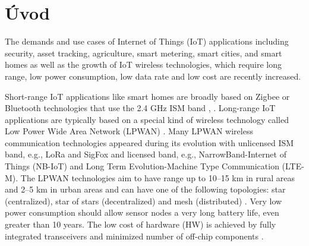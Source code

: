 \chapter{Úvod}
The demands and use cases of Internet of Things (IoT) applications including security, asset tracking, agriculture, smart metering, smart cities, and smart homes as well as the growth of IoT wireless technologies, which require long range, low power consumption, low data rate and low cost are recently increased.

Short-range IoT applications like smart homes are broadly based on Zigbee or Bluetooth technologies that use the 2.4 GHz ISM band \cite{Design and Implementation of an IoT Assisted Real Time ZigBee Mesh WSN}, \cite{Internet of Things (IoT) for building Smart Home System}.
Long-range IoT applications are typically based on a special kind of wireless technology called Low Power Wide Area Network (LPWAN) \cite{A comparative study of LPWAN technologies for large-scale IoTdeployment}. Many LPWAN wireless communication technologies appeared during its evolution with unlicensed ISM band, e.g., LoRa and SigFox and licensed band, e.g., NarrowBand-Internet of Things (NB-IoT) and Long Term Evolution-Machine Type Communication (LTE-M).
The LPWAN technologies aim to have range up to 10–15 km in rural areas and 2–5 km in urban areas \cite{Long-Range Communications in Unlicensed Bands} and can have one of the following topologies: star (centralized), star of stars (decentralized) and mesh (distributed) \cite{high density LPWAN}.
Very low power consumption should allow sensor nodes a very long battery life, even greater than 10 years.
The low cost of hardware (HW) is achieved by fully integrated transceivers and minimized number of off-chip components \cite{MURS Band for LPWAN Applications}.

